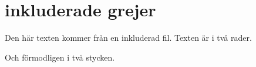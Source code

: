 \section{inkluderade grejer}
Den här texten kommer från en inkluderad fil.
Texten är i två rader.

Och förmodligen i två stycken.
